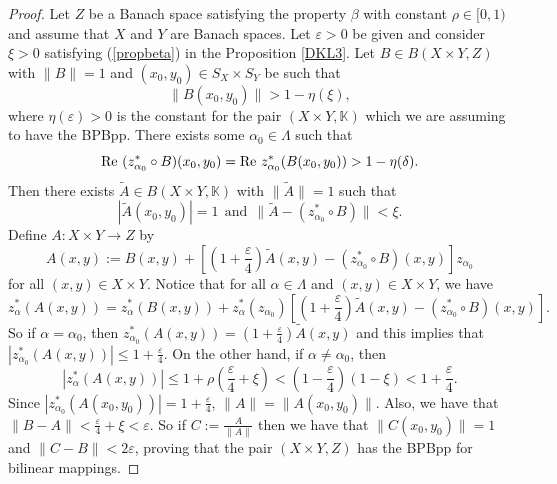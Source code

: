 \documentclass[12pt,a4paper]{amsart}
\theoremstyle{definition}
\newcommand{\e}{\varepsilon}
\DeclareMathOperator{\re}{Re}
\numberwithin{equation}{section}
\newcommand{\K}{\mathbb{K}} %
\def\K{{\mathbb K}}
\def\re{\hbox{\rm Re~}}
\begin{document}
\begin{proof} Let $Z$ be a Banach space satisfying the property $\beta$ with constant $\rho \in [0, 1)$ and assume that $X$ and $Y$ are Banach spaces. Let $\e > 0$ be given and consider $\xi > 0$ satisfying (\ref{propbeta}) in the Proposition \ref{DKL3}. Let $B \in B(X \times Y, Z)$ with $\|B\|= 1$ and $(x_0, y_0) \in S_X \times S_Y$ be such that 
\begin{equation*}
\|B(x_0, y_0)\| > 1 - \eta(\xi),
\end{equation*}
where $\eta(\e) > 0$ is the constant for the pair $(X \times Y, \K)$ which we are assuming to have the BPBpp. There exists some $\alpha_0 \in \Lambda$ such that
\begin{equation*}
\re (z_{\alpha_0}^* \circ B)(x_0, y_0) = \re z_{\alpha_0}^* (B(x_0, y_0)) > 1 - \eta(\delta).
\end{equation*}
Then there exists $\widetilde{A} \in B(X \times Y, \K)$ with $\|\widetilde{A}\| = 1$ such that 
\begin{equation*}
| \widetilde{A} (x_0, y_0)| = 1 \ \ \mbox{and} \ \ \| \widetilde{A} - (z_{\alpha_0}^* \circ B) \| < \xi.
\end{equation*}
Define $A: X \times Y \longrightarrow Z$ by
\begin{equation*}
A(x, y) := B(x, y) + \left[ \left( 1 + \frac{\e}{4} \right) \widetilde{A}(x, y) - (z_{\alpha_0}^* \circ B) (x, y) \right] z_{\alpha_0}
\end{equation*}
for all $(x, y) \in X \times Y$. Notice that for all $\alpha \in \Lambda$ and $(x, y) \in X \times Y$, we have
\begin{equation*}
z_{\alpha}^* (A(x, y)) = z_{\alpha}^* (B(x, y)) + z_{\alpha}^* (z_{\alpha_0}) \left[ \left( 1 + \frac{\e}{4} \right) \widetilde{A}(x, y) - (z_{\alpha_0}^* \circ B)(x, y) \right].
\end{equation*}
So if $\alpha = \alpha_0$, then $z_{\alpha_0}^*(A(x, y)) = \left(1  + \frac{\e}{4}\right) \widetilde{A} (x, y)$ and this implies that $|z_{\alpha_0}^*(A(x, y))| \leq 1 + \frac{\e}{4}$. On the other hand, if $\alpha \not= \alpha_0$, then
\begin{equation*}
|z_{\alpha}^*(A(x, y))| \leq 1 + \rho \left( \frac{\e}{4} + \xi \right) < \left(1 - \frac{\e}{4} \right)(1 - \xi) < 1 + \frac{\e}{4}.
\end{equation*}
Since $|z_{\alpha_0}^*(A(x_0, y_0))| = 1 + \frac{\e}{4}$, $\|A\| = \|A(x_0, y_0)\|$. Also, we have that $\|B - A\| < \frac{\e}{4} + \xi < \e$. So if $C := \frac{A}{\|A\|}$ then we have that $\|C(x_0, y_0)\| = 1$ and $\|C - B\| < 2 \e$, proving that the pair $(X \times Y, Z)$ has the BPBpp for bilinear mappings.
\end{proof}
\end{document}
